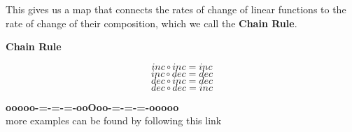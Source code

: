 \documentclass{ximera}
\begin{document}
This gives us a map that connects the rates of change of linear functions to the rate of change of their composition, which we call the \textbf{Chain Rule}.


\begin{idea} \textbf{\textcolor{blue!55!black}{Chain Rule}}


\[ inc \circ inc = inc \]
\[ inc \circ dec = dec \]
\[ dec \circ inc = dec \]
\[ dec \circ dec = inc \]


\end{idea}














\begin{onlineOnly}
\begin{center}
\textbf{\textcolor{green!50!black}{ooooo-=-=-=-ooOoo-=-=-=-ooooo}} \\

more examples can be found by following this link\\ 

\end{center}
\end{onlineOnly}
\end{document}
